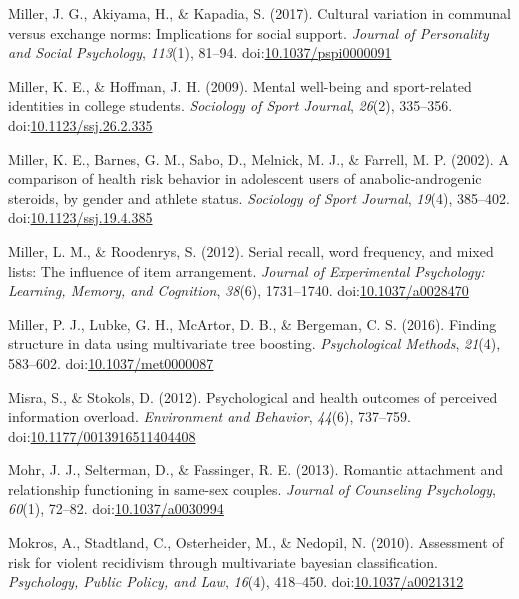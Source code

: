 \documentclass[english,man]{apa6}
\begin{document}
\hypertarget{ref-Miller2017a}{}
Miller, J. G., Akiyama, H., \& Kapadia, S. (2017). Cultural variation in
communal versus exchange norms: Implications for social support.
\emph{Journal of Personality and Social Psychology}, \emph{113}(1),
81--94.
doi:\href{https://doi.org/10.1037/pspi0000091}{10.1037/pspi0000091}

\hypertarget{ref-Miller2009}{}
Miller, K. E., \& Hoffman, J. H. (2009). Mental well-being and
sport-related identities in college students. \emph{Sociology of Sport
Journal}, \emph{26}(2), 335--356.
doi:\href{https://doi.org/10.1123/ssj.26.2.335}{10.1123/ssj.26.2.335}

\hypertarget{ref-Miller2002}{}
Miller, K. E., Barnes, G. M., Sabo, D., Melnick, M. J., \& Farrell, M.
P. (2002). A comparison of health risk behavior in adolescent users of
anabolic-androgenic steroids, by gender and athlete status.
\emph{Sociology of Sport Journal}, \emph{19}(4), 385--402.
doi:\href{https://doi.org/10.1123/ssj.19.4.385}{10.1123/ssj.19.4.385}

\hypertarget{ref-Miller2012}{}
Miller, L. M., \& Roodenrys, S. (2012). Serial recall, word frequency,
and mixed lists: The influence of item arrangement. \emph{Journal of
Experimental Psychology: Learning, Memory, and Cognition}, \emph{38}(6),
1731--1740.
doi:\href{https://doi.org/10.1037/a0028470}{10.1037/a0028470}

\hypertarget{ref-Miller2016}{}
Miller, P. J., Lubke, G. H., McArtor, D. B., \& Bergeman, C. S. (2016).
Finding structure in data using multivariate tree boosting.
\emph{Psychological Methods}, \emph{21}(4), 583--602.
doi:\href{https://doi.org/10.1037/met0000087}{10.1037/met0000087}

\hypertarget{ref-Misra2012}{}
Misra, S., \& Stokols, D. (2012). Psychological and health outcomes of
perceived information overload. \emph{Environment and Behavior},
\emph{44}(6), 737--759.
doi:\href{https://doi.org/10.1177/0013916511404408}{10.1177/0013916511404408}

\hypertarget{ref-Mohr2013}{}
Mohr, J. J., Selterman, D., \& Fassinger, R. E. (2013). Romantic
attachment and relationship functioning in same-sex couples.
\emph{Journal of Counseling Psychology}, \emph{60}(1), 72--82.
doi:\href{https://doi.org/10.1037/a0030994}{10.1037/a0030994}

\hypertarget{ref-Mokros2010}{}
Mokros, A., Stadtland, C., Osterheider, M., \& Nedopil, N. (2010).
Assessment of risk for violent recidivism through multivariate bayesian
classification. \emph{Psychology, Public Policy, and Law}, \emph{16}(4),
418--450. doi:\href{https://doi.org/10.1037/a0021312}{10.1037/a0021312}
\end{document}
